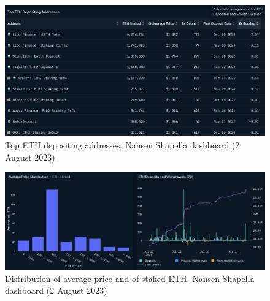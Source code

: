 \documentclass[UTF8]{article}
\begin{document}
{\begin{figure}[htbp]
\begin{center}
\includegraphics[width=0.8\linewidth]{images/nansen7}
\caption{Top ETH depositing addresses. Nansen Shapella dashboard (2 August 2023)}
\label{fig:nansen7}
\end{center}
\end{figure}

\begin{figure}[htbp]
\begin{center}
\includegraphics[width=\linewidth]{images/nansen9}
\caption{Distribution of average price and of staked ETH. Nansen Shapella dashboard (2 August 2023)}
\label{fig:nansen9}
\end{center}
\end{figure}

}
\end{document}
